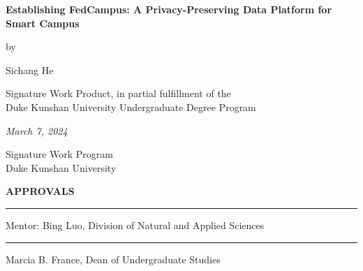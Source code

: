 \documentclass[11pt,a4paper,oneside]{report}
\begin{document}
\newcommand{\authorname}{Sichang He}

\newcommand{\thetitle}{Establishing FedCampus:
    A Privacy-Preserving Data Platform for Smart Campus
}

\newcommand{\submissiondate}{March 7, 2024}

\newcommand{\mentor}{Bing Luo}

\newcommand{\academicunit}{Division of Natural and Applied Sciences}



\begin{titlepage}

\vspace*{\bigskipamount}

\begin{center}
{\sffamily\LARGE\bfseries\MakeUppercase\thetitle\par}

\bigskip

by

\bigskip

{\Large \authorname}

\bigskip

Signature Work Product, in partial fulfillment of the \\
Duke Kunshan University Undergraduate Degree Program

\bigskip

\emph{\submissiondate}

\bigskip

Signature Work Program \\
Duke Kunshan University

\end{center}

\vfill

\textbf{\textsf{APPROVALS}}

\bigskip\bigskip\bigskip
\hrule

Mentor: \mentor, \academicunit

\bigskip\bigskip\bigskip
\hrule

Marcia B. France, Dean of Undergraduate Studies

\end{titlepage}
\end{document}
